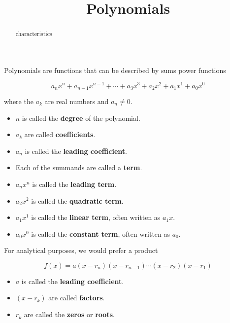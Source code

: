 \documentclass{ximera}
\title{Polynomials}
\begin{document}
\begin{abstract}
characteristics
\end{abstract}
\maketitle


Polynomials are functions that can be described by sums power functions


\[    a_n x^n + a_{n-1} x^{n-1} + \cdots + a_3 x^3 + a_2 x^2 + a_1 x^1 + a_0 x^0      \]

where the $a_k$ are real numbers and $a_n \ne 0$.


\begin{itemize}

\item $n$ is called the \textbf{degree} of the polynomial.
\item $a_k$ are called \textbf{coefficients}.
\item $a_n$ is called the \textbf{leading coefficient}.
\item Each of the summands are called a \textbf{term}.  
\item $a_n x^n$ is called the \textbf{leading term}.
\item $a_2 x^2$ is called the \textbf{quadratic term}.
\item $a_1 x^1$ is called the \textbf{linear term}, often written as $a_1 x$.
\item $a_0 x^0$ is called the \textbf{constant term}, often written as $a_0$.

\end{itemize}







For analytical purposes, we would prefer a product

\[   f(x) = a (x-r_n)(x-r_{n-1})  \cdots (x-r_2)(x-r_1)  \]


\begin{itemize}

\item $a$ is called the \textbf{leading coefficient}.
\item $(x-r_k)$ are called \textbf{factors}.
\item $r_k$ are called the \textbf{zeros} or \textbf{roots}.

\end{itemize}
\end{document}
